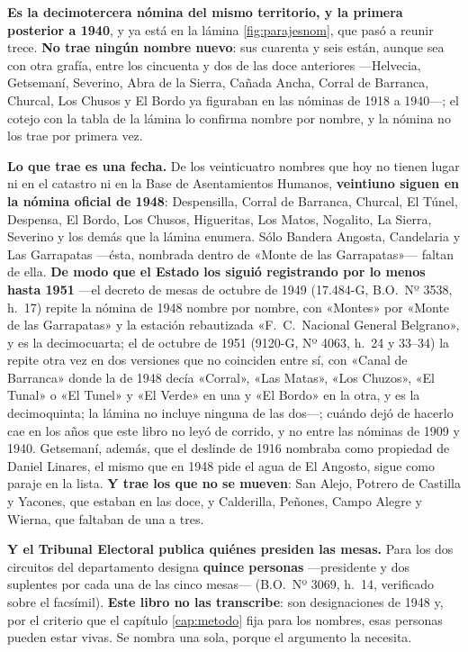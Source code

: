 \begin{cautela}
\textbf{Es la decimotercera nómina del mismo territorio, y la primera posterior a 1940}, y ya
está en la lámina \ref{fig:parajesnom}, que pasó a reunir trece. \textbf{No trae ningún nombre
nuevo}: sus cuarenta y seis están, aunque sea con otra grafía, entre los cincuenta y dos de las
doce anteriores ---Helvecia, Getsemaní, Severino, Abra de la Sierra, Cañada Ancha, Corral de
Barranca, Churcal, Los Chusos y El Bordo ya figuraban en las nóminas de 1918 a 1940---; el cotejo con la tabla de
la lámina lo confirma nombre por nombre, y la nómina no los trae
por primera vez.

\textbf{Lo que trae es una fecha.} De los veinticuatro nombres que hoy no tienen lugar ni en el
catastro ni en la Base de Asentamientos Humanos, \textbf{veintiuno siguen en la nómina oficial de
1948}: Despensilla, Corral de Barranca, Churcal, El Túnel, Despensa, El Bordo, Los Chusos,
Higueritas, Los Matos, Nogalito, La Sierra, Severino y los demás que la lámina enumera. Sólo
Bandera Angosta, Candelaria y Las Garrapatas ---ésta, nombrada dentro de «Monte de las
Garrapatas»--- faltan de ella. \textbf{De modo que el Estado los siguió registrando por lo menos hasta
1951} ---el decreto de mesas de octubre de 1949 (17.484-G, B.O.\ Nº 3538, h.\ 17) repite la nómina de
1948 nombre por nombre, con «Montes» por «Monte de las Garrapatas» y la estación rebautizada
«F.\ C.\ Nacional General Belgrano», y es la decimocuarta; el de octubre de 1951 (9120-G, Nº 4063, h.\ 24 y 33--34) la repite otra vez en dos versiones que no coinciden entre sí, con «Canal de Barranca» donde la de 1948 decía «Corral», «Las Matas», «Los Chuzos», «El Tunal» o «El Tunel» y «El Verde» en una y «El Bordo» en la otra, y es la decimoquinta; la lámina no incluye ninguna de las dos---; cuándo dejó de hacerlo cae en los años que este libro no leyó de corrido, y no entre las
nóminas de 1909 y 1940. Getsemaní, además, que el deslinde de 1916 nombraba
como propiedad de Daniel Linares, el mismo que en 1948 pide el agua de El Angosto, sigue como
paraje en la lista. \textbf{Y trae los que no se mueven}: San Alejo, Potrero de Castilla y Yacones,
que estaban en las doce, y Calderilla, Peñones, Campo Alegre y Wierna, que faltaban de una a tres.

\textbf{Y el Tribunal Electoral publica quiénes presiden las mesas.} Para los dos circuitos
del departamento designa \textbf{quince personas} ---presidente y dos suplentes por cada una de
las cinco mesas--- (B.O.\ Nº 3069, h.\ 14, verificado sobre el facsímil). \textbf{Este libro no
las transcribe}: son designaciones de 1948 y, por el criterio que el capítulo
\ref{cap:metodo} fija para los nombres, esas personas pueden estar vivas. Se nombra una sola, porque el
argumento la necesita.


\end{cautela}
